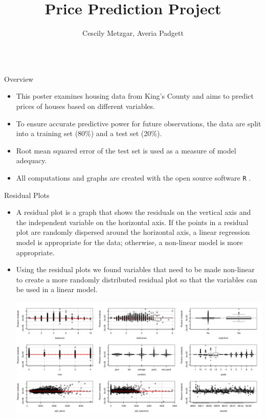 \documentclass[final]{beamer}\usepackage[]{graphicx}\usepackage[]{color}
\title{Price Prediction Project}
\author{Cescily Metzgar, Averia Padgett}
\institute{Department of Mathematical Sciences}
\makeatletter
\def\maxwidth{ %
  \ifdim\Gin@nat@width>\linewidth
    \linewidth
  \else
    \Gin@nat@width
  \fi
}
\newenvironment{knitrout}{}{} %
\makeatother
\begin{document}
\begin{frame}[fragile]
\vspace{-2ex}
\begin{columns}[t]



\begin{column}{0.31\linewidth}
\begin{minipage}[t][.955\textheight]{\linewidth} 

\vspace{0ex}
\begin{block}{Overview}
\begin{itemize}
\item This poster examines housing data from King's County and aims to predict prices of houses based on different variables.  
\item To ensure accurate predictive power for future observations, the data are split into a training set (80\%) and a test set (20\%). 
\item Root mean squared error of the test set is used as a measure of model adequacy.  
\item All computations and graphs are created with the open source software \texttt{R} \cite{R-base}. 
\end{itemize}
\vspace{0ex}
\end{block}
\vfill

\begin{block}{Residual Plots}
\begin{itemize}
\item A residual plot is a graph that shows the residuals on the vertical axis and the independent variable on the horizontal axis. If the points in a residual plot are randomly dispersed around the horizontal axis, a linear regression model is appropriate for the data; otherwise, a non-linear model is more appropriate.
\vspace{2ex}
\item Using the residual plots we found variables that need to be made non-linear to create a more randomly distributed residual plot so that the variables can be used in a linear model. 

\begin{knitrout}
\color{fgcolor}

{\centering \includegraphics[width=\maxwidth]{figure/unnamed-chunk-1-1} 

}
\end{knitrout}
\end{itemize}
\end{block}
\end{minipage}
\end{column}
\end{columns}
\end{frame}
\end{document}

